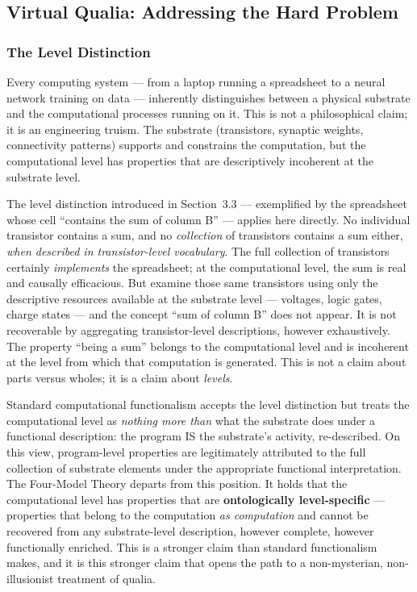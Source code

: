 \documentclass[12pt]{article}
\newcommand{\rev}[1]{#1}
\begin{document}
\subsection{Virtual Qualia: \rev{Addressing} the Hard Problem}



\subsubsection{The Level Distinction}


Every computing system --- from a laptop running a spreadsheet to a neural network training on data --- inherently distinguishes between a physical substrate and the computational processes running on it. This is not a philosophical claim; it is an engineering truism. The substrate (transistors, synaptic weights, connectivity patterns) supports and constrains the computation, but the computational level has properties that are descriptively incoherent at the substrate level.

The level distinction introduced in Section~3.3 --- exemplified by the spreadsheet whose cell ``contains the sum of column B'' --- applies here directly. No individual transistor contains a sum, and no \emph{collection} of transistors contains a sum either, \emph{when described in transistor-level vocabulary}. The full collection of transistors certainly \emph{implements} the spreadsheet; at the computational level, the sum is real and causally efficacious. But examine those same transistors using only the descriptive resources available at the substrate level --- voltages, logic gates, charge states --- and the concept ``sum of column B'' does not appear. It is not recoverable by aggregating transistor-level descriptions, however exhaustively. The property ``being a sum'' belongs to the computational level and is incoherent at the level from which that computation is generated. This is not a claim about parts versus wholes; it is a claim about \emph{levels}.

Standard computational functionalism \citep{Putnam1967,Chalmers1996} accepts the level distinction but treats the computational level as \emph{nothing more than} what the substrate does under a functional description: the program IS the substrate's activity, re-described. On this view, program-level properties are legitimately attributed to the full collection of substrate elements under the appropriate functional interpretation. The Four-Model Theory departs from this position. It holds that the computational level has properties that are \textbf{ontologically level-specific} --- properties that belong to the computation \emph{as computation} and cannot be recovered from any substrate-level description, however complete, however functionally enriched. This is a stronger claim than standard functionalism makes, and it is this stronger claim that opens the path to a non-mysterian, non-illusionist treatment of qualia.
\end{document}
